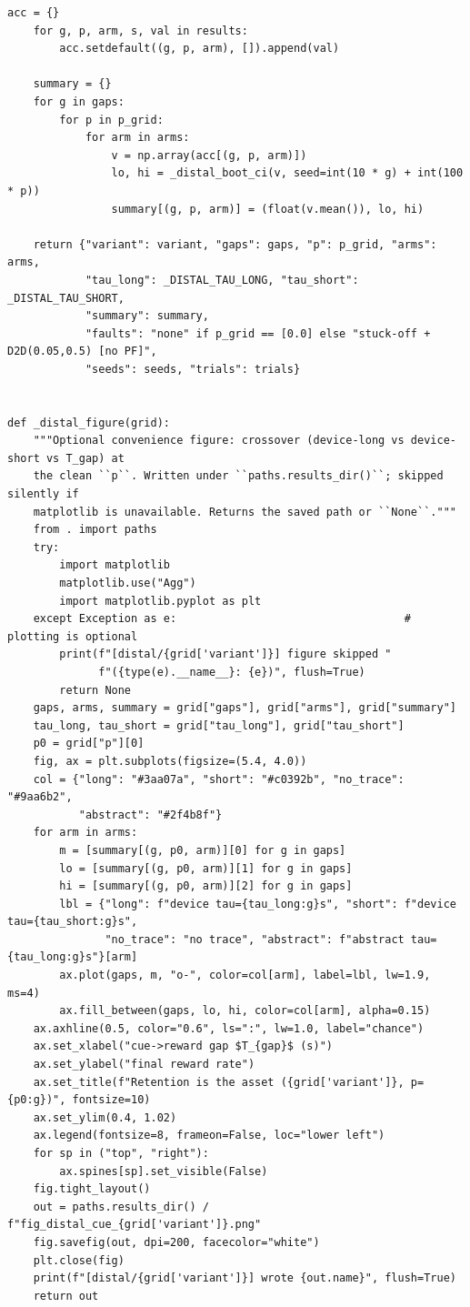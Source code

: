 \begin{lstlisting}[caption={mrl\_trace/distal\_cue.py},label={lst:siox-src-distal_cue}]
    acc = {}
    for g, p, arm, s, val in results:
        acc.setdefault((g, p, arm), []).append(val)

    summary = {}
    for g in gaps:
        for p in p_grid:
            for arm in arms:
                v = np.array(acc[(g, p, arm)])
                lo, hi = _distal_boot_ci(v, seed=int(10 * g) + int(100 * p))
                summary[(g, p, arm)] = (float(v.mean()), lo, hi)

    return {"variant": variant, "gaps": gaps, "p": p_grid, "arms": arms,
            "tau_long": _DISTAL_TAU_LONG, "tau_short": _DISTAL_TAU_SHORT,
            "summary": summary,
            "faults": "none" if p_grid == [0.0] else "stuck-off + D2D(0.05,0.5) [no PF]",
            "seeds": seeds, "trials": trials}


def _distal_figure(grid):
    """Optional convenience figure: crossover (device-long vs device-short vs T_gap) at
    the clean ``p``. Written under ``paths.results_dir()``; skipped silently if
    matplotlib is unavailable. Returns the saved path or ``None``."""
    from . import paths
    try:
        import matplotlib
        matplotlib.use("Agg")
        import matplotlib.pyplot as plt
    except Exception as e:                                   # plotting is optional
        print(f"[distal/{grid['variant']}] figure skipped "
              f"({type(e).__name__}: {e})", flush=True)
        return None
    gaps, arms, summary = grid["gaps"], grid["arms"], grid["summary"]
    tau_long, tau_short = grid["tau_long"], grid["tau_short"]
    p0 = grid["p"][0]
    fig, ax = plt.subplots(figsize=(5.4, 4.0))
    col = {"long": "#3aa07a", "short": "#c0392b", "no_trace": "#9aa6b2",
           "abstract": "#2f4b8f"}
    for arm in arms:
        m = [summary[(g, p0, arm)][0] for g in gaps]
        lo = [summary[(g, p0, arm)][1] for g in gaps]
        hi = [summary[(g, p0, arm)][2] for g in gaps]
        lbl = {"long": f"device tau={tau_long:g}s", "short": f"device tau={tau_short:g}s",
               "no_trace": "no trace", "abstract": f"abstract tau={tau_long:g}s"}[arm]
        ax.plot(gaps, m, "o-", color=col[arm], label=lbl, lw=1.9, ms=4)
        ax.fill_between(gaps, lo, hi, color=col[arm], alpha=0.15)
    ax.axhline(0.5, color="0.6", ls=":", lw=1.0, label="chance")
    ax.set_xlabel("cue->reward gap $T_{gap}$ (s)")
    ax.set_ylabel("final reward rate")
    ax.set_title(f"Retention is the asset ({grid['variant']}, p={p0:g})", fontsize=10)
    ax.set_ylim(0.4, 1.02)
    ax.legend(fontsize=8, frameon=False, loc="lower left")
    for sp in ("top", "right"):
        ax.spines[sp].set_visible(False)
    fig.tight_layout()
    out = paths.results_dir() / f"fig_distal_cue_{grid['variant']}.png"
    fig.savefig(out, dpi=200, facecolor="white")
    plt.close(fig)
    print(f"[distal/{grid['variant']}] wrote {out.name}", flush=True)
    return out



\end{lstlisting}
